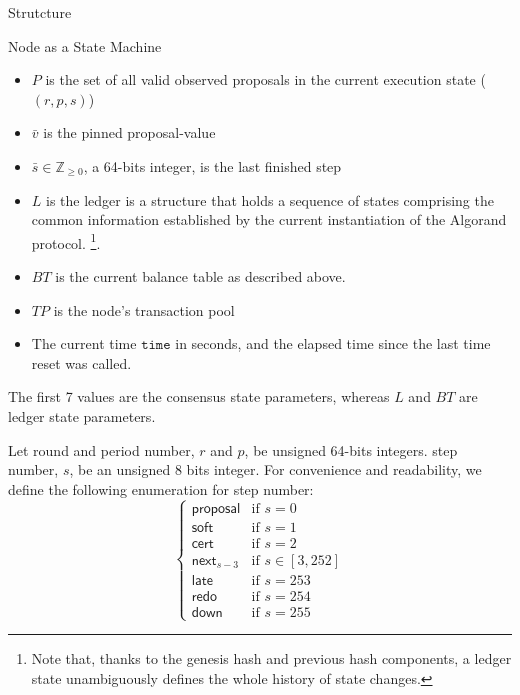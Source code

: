 \documentclass[10pt,a4paper]{article}
\begin{document}
\begin{section}{Strutcture}
\begin{subsection}{Node as a State Machine}
\begin{itemize}
    \item
    $P$ is the set of all {\sf valid observed proposals}
    in the current execution state ($(r,p,s)$)
    
    \item
    $\bar{v}$ is the pinned proposal-value
    
    \item
    $\bar{s}\in\mathbb{Z}_{\ge 0}$, a 64-bits integer, is the {\sf last finished step}
    
    \item
    $L$ is the {\sf ledger} is a structure that holds a sequence of states comprising the common
    information established by the current instantiation of the Algorand protocol.
    \footnote{Note that, thanks to the genesis hash and previous 
    hash components, a ledger state unambiguously defines the whole history of state changes.}. 
    
    \item
    $BT$ is the current balance table as described above.
    
    \item
    $TP$ is the node's transaction pool

    \item 
    The current time $\mathtt{time}$ in seconds, and the elapsed time since the last
    time reset was called.
\end{itemize}
The first 7 values are the {\sf consensus state parameters},
whereas $L$ and $BT$ are {\sf ledger state parameters}.

Let round and period number, $r$ and $p$, be unsigned 64-bits integers. 
step number, $s$, be an unsigned 8 bits integer.
For convenience and readability, we define the following enumeration for step number:
\begin{equation}\label{table:s}
\left\{    
    \begin{array}{ll}
        \mathsf{proposal}&\mbox{if }s=0 \\
        \mathsf{soft}&\mbox{if }s=1 \\
        \mathsf{cert}&\mbox{if }s=2\\
        \mathsf{next}_{s-3}&\mbox{if }s\in [3, 252]\\
        \mathsf{late}&\mbox{if }s=253\\
        \mathsf{redo}&\mbox{if }s=254\\
        \mathsf{down}&\mbox{if }s=255
    \end{array}
\right.
\end{equation}


\end{subsection}
\end{section}
\end{document}
